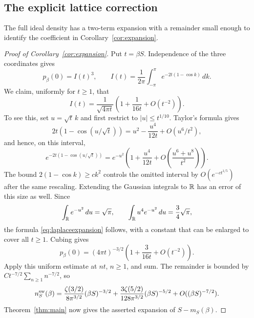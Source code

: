 \subsection{The explicit lattice correction}

The full ideal density has a two-term expansion with a remainder
small enough to identify the coefficient in
Corollary~\ref{cor:expansion}.

\begin{proof}[Proof of Corollary~\ref{cor:expansion}]
Put $t=\beta S$.  Independence of the three coordinates gives
\[
 p_\beta(0)=I(t)^3,\qquad
 I(t)=\frac1{2\pi}\int_{-\pi}^{\pi}
                         e^{-2t(1-\cos k)}\,dk.
\]
We claim, uniformly for $t\ge1$, that
\begin{equation}\label{eq:laplaceexpansion}
 I(t)=\frac1{\sqrt{4\pi t}}
          \left(1+\frac1{16t}+O(t^{-2})\right).
\end{equation}
To see this, set $u=\sqrt t\,k$ and first restrict to
$|u|\le t^{1/10}$.  Taylor's formula gives
\[
 2t(1-\cos(u/\sqrt t))
       =u^2-\frac{u^4}{12t}+O(u^6/t^2),
\]
and hence, on this interval,
\[
 e^{-2t(1-\cos(u/\sqrt t))}
 =e^{-u^2}\left(1+\frac{u^4}{12t}
                   +O\!\left(\frac{u^6+u^8}{t^2}\right)\right).
\]
The bound $2(1-\cos k)\ge c k^2$ controls the omitted interval by
$O(e^{-c t^{1/5}})$ after the same rescaling.  Extending the
Gaussian integrals to $\mathbb R$ has an error of this size as well.
Since
\[
 \int_\mathbb R e^{-u^2}\,du=\sqrt\pi,
 \qquad
 \int_\mathbb R u^4e^{-u^2}\,du=\frac34\sqrt\pi,
\]
the formula \eqref{eq:laplaceexpansion} follows, with a constant
that can be enlarged to cover all $t\ge1$.
Cubing gives
\[
 p_\beta(0)
   =(4\pi t)^{-3/2}\left(1+\frac3{16t}+O(t^{-2})\right).
\]
Apply this uniform estimate at $nt$, $n\ge1$, and sum.
The remainder is bounded by
$Ct^{-7/2}\sum_{n\ge1}n^{-7/2}$, so
\begin{equation}\label{eq:idealdensityexpansion}
 n_S^{\rm sw}(\beta)
  =\frac{\zeta(3/2)}{8\pi^{3/2}}(\beta S)^{-3/2}
   +\frac{3\zeta(5/2)}{128\pi^{3/2}}(\beta S)^{-5/2}
   +O((\beta S)^{-7/2}).
\end{equation}
Theorem~\ref{thm:main} now gives the asserted expansion of
$S-m_S(\beta)$.
\end{proof}
